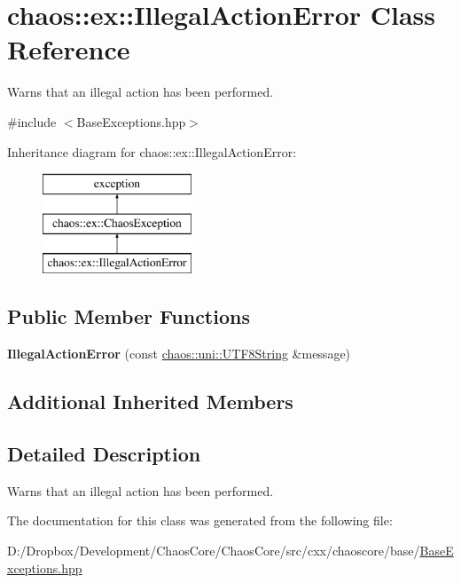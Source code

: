 \hypertarget{classchaos_1_1ex_1_1_illegal_action_error}{}\section{chaos\+:\+:ex\+:\+:Illegal\+Action\+Error Class Reference}
\label{classchaos_1_1ex_1_1_illegal_action_error}


Warns that an illegal action has been performed.  




{\ttfamily \#include $<$Base\+Exceptions.\+hpp$>$}

Inheritance diagram for chaos\+:\+:ex\+:\+:Illegal\+Action\+Error\+:\begin{figure}[H]
\begin{center}
\leavevmode
\includegraphics[height=3.000000cm]{classchaos_1_1ex_1_1_illegal_action_error}
\end{center}
\end{figure}
\subsection*{Public Member Functions}
\begin{DoxyCompactItemize}
\item 
\hypertarget{classchaos_1_1ex_1_1_illegal_action_error_a96fbdbcf8802979b3e4e10321edd4213}{}{\bfseries Illegal\+Action\+Error} (const \hyperlink{classchaos_1_1uni_1_1_u_t_f8_string}{chaos\+::uni\+::\+U\+T\+F8\+String} \&message)\label{classchaos_1_1ex_1_1_illegal_action_error_a96fbdbcf8802979b3e4e10321edd4213}

\end{DoxyCompactItemize}
\subsection*{Additional Inherited Members}


\subsection{Detailed Description}
Warns that an illegal action has been performed. 

The documentation for this class was generated from the following file\+:\begin{DoxyCompactItemize}
\item 
D\+:/\+Dropbox/\+Development/\+Chaos\+Core/\+Chaos\+Core/src/cxx/chaoscore/base/\hyperlink{_base_exceptions_8hpp}{Base\+Exceptions.\+hpp}\end{DoxyCompactItemize}
